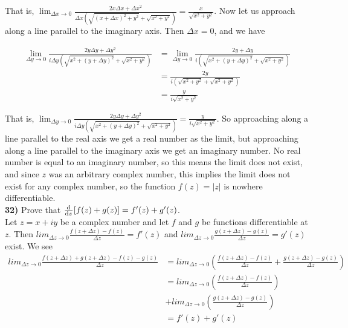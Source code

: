 \documentclass{scrartcl}
\begin{document}
That is, $\lim_{\Delta x \rightarrow 0} \frac{2x\Delta x + \Delta x^2}{\Delta x (\sqrt{(x + \Delta x)^2 + y^2} + \sqrt{x^2 + y^2})} = \frac{x}{\sqrt{x^2 + y^2}}$. Now let us approach along a line parallel to the imaginary axis. Then $\Delta x = 0$, and we have

\begin{align*}
  \lim_{\Delta y \rightarrow 0} \frac{2y\Delta y + \Delta y^2}{i\Delta y (\sqrt{x^2 + (y + \Delta y)^2} + \sqrt{x^2 + y^2})} &= \lim_{\Delta y \rightarrow 0}\frac{2y + \Delta y}{i(\sqrt{x^2 + (y+\Delta y)^2} + \sqrt{x^2 + y^2})}\\
  &= \frac{2y}{i(\sqrt{x^2 + y^2} + \sqrt{x^2 + y^2})}\\
  &= \frac{y}{i\sqrt{x^2 + y^2}}
\end{align*}

That is, $\lim_{\Delta y \rightarrow 0} \frac{2y\Delta y + \Delta y^2}{i\Delta y (\sqrt{x^2 + (y + \Delta y)^2} + \sqrt{x^2 + y^2})} = \frac{y}{i\sqrt{x^2 + y^2}}$. So approaching along a line parallel to the real axis we get a real number as the limit, but approaching along a line parallel to the imaginary axis we get an imaginary number. No real number is equal to an imaginary number, so this means the limit does not exist, and since $z$ was an arbitrary complex number, this implies the limit does not exist for any complex number, so the function $f(z) = |z|$ is nowhere differentiable.\\

\textbf{32)} Prove that $\od{}{z}[f(z) + g(z)] = f'(z) + g'(z)$.\\

Let $z=x+iy$ be a complex number and let $f$ and $g$ be functions differentiable at $z$. Then $lim_{\Delta z \rightarrow 0}\frac{f(z + \Delta z) - f(z)}{\Delta z} = f'(z)$ and $lim_{\Delta z \rightarrow 0}\frac{g(z + \Delta z) - g(z)}{\Delta z} = g'(z)$ exist. We see
\begin{align*}
  lim_{\Delta z \rightarrow 0}\frac{f(z + \Delta z) + g(z + \Delta z) - f(z) - g(z)}{\Delta z} &= lim_{\Delta z \rightarrow 0}\left(\frac{f(z + \Delta z) - f(z)}{\Delta z} + \frac{g(z + \Delta z) - g(z)}{\Delta z}\right)\\
  &= lim_{\Delta z \rightarrow 0}\left(\frac{f(z + \Delta z) - f(z)}{\Delta z}\right)\\
  &+ lim_{\Delta z \rightarrow 0}\left(\frac{g(z + \Delta z) - g(z)}{\Delta z}\right)\\
  &= f'(z) + g'(z)
\end{align*} 
\end{document}
